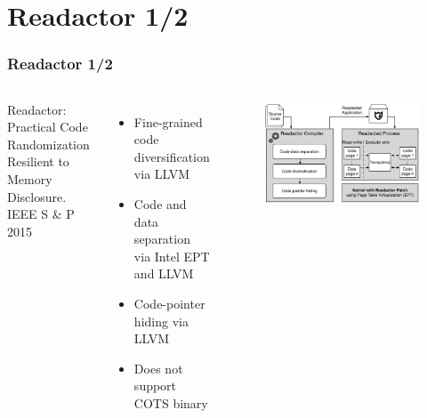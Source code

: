 \documentclass[aspectratio=169]{beamer}
\begin{document}
\section{Readactor 1/2}
\begin{frame}
\frametitle{Readactor 1/2}
\begin{columns}[c]
Readactor: Practical Code Randomization Resilient to Memory Disclosure. IEEE S \& P 2015
\begin{itemize}
\item Fine-grained code diversification via LLVM
\item Code and data separation via Intel EPT and LLVM
\item Code-pointer hiding via LLVM
\item Does not support COTS binary
\end{itemize}
\begin{figure}
\includegraphics[width=1.0\linewidth]{figures/readactor-framework.pdf}
\end{figure}
\end{columns}
\end{frame}

\end{document}
